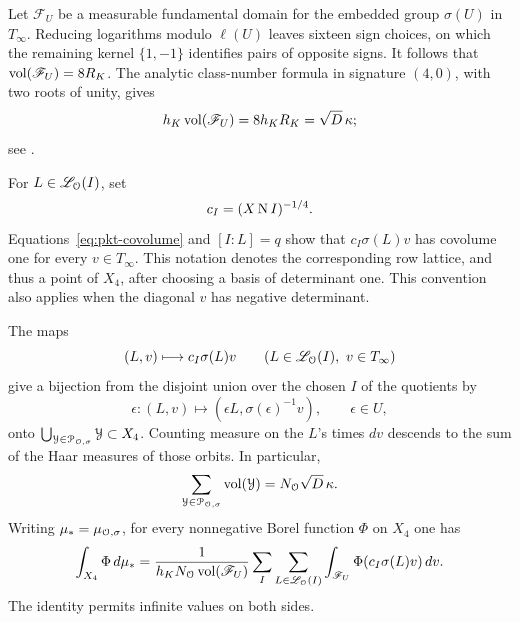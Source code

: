 Let \(\mathscr F_U\) be a measurable fundamental domain for the embedded
group \(\sigma(U)\) in \(T_\infty\).  Reducing logarithms modulo
\(\ell(U)\) leaves sixteen sign choices, on which the remaining kernel
\(\{1,-1\}\) identifies pairs of opposite signs.  It follows that
\(\operatorname{vol}(\mathscr F_U)=8R_K\).  The analytic class-number formula in
signature \((4,0)\), with two roots of unity, gives
\begin{equation}\label{eq:pkt-unit-volume}
 h_K\operatorname{vol}(\mathscr F_U)=8h_KR_K=\sqrt D\,\kappa;
\end{equation}
see \cite[Chapter~V, Theorem~2.4(a)]{MilneCFT}.

For \(L\in\mathscr L_{\mathcal O}(I)\), set
\[
 c_I=(X\operatorname{N} I)^{-1/4}.
\]
Equations~\eqref{eq:pkt-covolume} and \([I:L]=q\) show that
\(c_I\sigma(L)v\) has covolume one for every \(v\in T_\infty\).
This notation denotes the corresponding row lattice, and thus a point
of \(X_4\), after choosing a basis of determinant one.  This convention
also applies when the diagonal \(v\) has negative determinant.

\begin{proposition}\label{prop:pkt-model}
The maps
\[
 (L,v)\longmapsto c_I\sigma(L)v
 \qquad
 (L\in\mathscr L_{\mathcal O}(I),\ v\in T_\infty)
\]
give a bijection from the disjoint union over the chosen \(I\) of the
quotients by
\begin{equation}\label{eq:pkt-unit-action}
 \epsilon:(L,v)\longmapsto
       (\epsilon L,\sigma(\epsilon)^{-1}v),\qquad \epsilon\in U,
\end{equation}
onto \(\bigcup_{\mathcal Y\in\mathcal P_{\mathcal O,\sigma}}\mathcal Y\subset X_4\).
Counting measure on the \(L\)'s times \(dv\) descends to the sum of
the Haar measures of those orbits.  In particular,
\begin{equation}\label{eq:pkt-total-volume}
 \sum_{\mathcal Y\in\mathcal P_{\mathcal O,\sigma}}\operatorname{vol}(\mathcal Y)
       =N_{\mathcal O}\sqrt D\,\kappa .
\end{equation}
Writing \(\mu_*=\mu_{\mathcal O,\sigma}\), for every nonnegative Borel
function \(\Phi\) on \(X_4\) one has
\begin{equation}\label{eq:pkt-integration}
 \int_{X_4}\Phi\,d\mu_*
 =\frac{1}{h_KN_{\mathcal O}\operatorname{vol}(\mathscr F_U)}
   \sum_I\sum_{L\in\mathscr L_{\mathcal O}(I)}
       \int_{\mathscr F_U}\Phi(c_I\sigma(L)v)\,dv .
\end{equation}
The identity permits infinite values on both sides.
\end{proposition}


